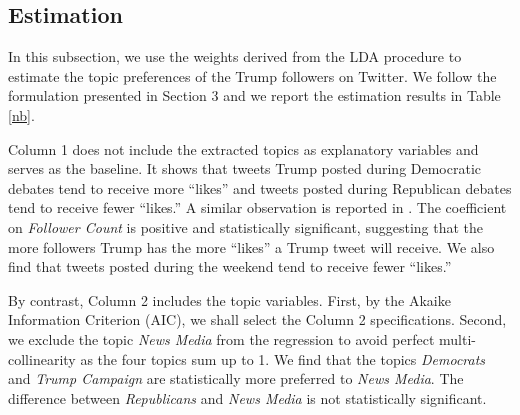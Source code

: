\documentclass[letterpaper]{article}
\begin{document}
\subsection{Estimation}
In this subsection, we use the weights derived from the LDA procedure to estimate the topic preferences of the Trump followers on Twitter. We follow the formulation presented in Section 3 and we report the estimation results in Table \ref{nb}.

Column 1 does not include the extracted topics as explanatory variables and serves as the baseline. It shows that tweets Trump posted during Democratic debates tend to receive more ``likes'' and tweets posted during Republican debates tend to receive fewer ``likes.'' A similar observation is reported in \cite{trumpists}. The coefficient on \textit{Follower Count} is positive and statistically significant, suggesting that the more followers Trump has the more ``likes'' a Trump tweet will receive.  We also find that tweets posted during the weekend tend to receive fewer ``likes.''

By contrast, Column 2 includes the topic variables. First, by the Akaike Information Criterion (AIC), we shall select the Column 2 specifications. Second, we exclude the topic \textit{News Media} from the regression to avoid perfect multi-collinearity as the four topics sum up to 1. We find that the topics \textit{Democrats} and \textit{Trump Campaign} are statistically more preferred to \textit{News Media}. The difference between \textit{Republicans} and \textit{News Media} is not statistically significant.
\end{document}

